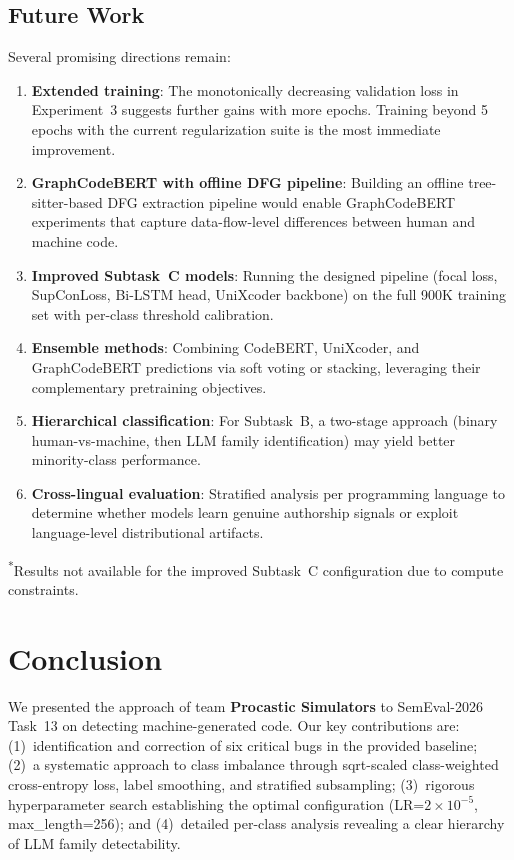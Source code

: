 \documentclass[11pt]{article}
\begin{document}
\subsection{Future Work}

Several promising directions remain:
\begin{enumerate}
    \item \textbf{Extended training}: The monotonically decreasing validation loss in Experiment~3 suggests further gains with more epochs. Training beyond 5 epochs with the current regularization suite is the most immediate improvement.
    \item \textbf{GraphCodeBERT with offline DFG pipeline}: Building an offline tree-sitter-based DFG extraction pipeline would enable GraphCodeBERT experiments that capture data-flow-level differences between human and machine code.
    \item \textbf{Improved Subtask~C models}: Running the designed pipeline (focal loss, SupConLoss, Bi-LSTM head, UniXcoder backbone) on the full 900K training set with per-class threshold calibration.
    \item \textbf{Ensemble methods}: Combining CodeBERT, UniXcoder, and GraphCodeBERT predictions via soft voting or stacking, leveraging their complementary pretraining objectives.
    \item \textbf{Hierarchical classification}: For Subtask~B, a two-stage approach (binary human-vs-machine, then LLM family identification) may yield better minority-class performance.
    \item \textbf{Cross-lingual evaluation}: Stratified analysis per programming language to determine whether models learn genuine authorship signals or exploit language-level distributional artifacts.
\end{enumerate}

\textsuperscript{*}Results not available for the improved Subtask~C configuration due to compute constraints.

\section{Conclusion}
\label{sec:conclusion}

We presented the approach of team \textbf{Procastic Simulators} to SemEval-2026 Task~13 on detecting machine-generated code. Our key contributions are: (1)~identification and correction of six critical bugs in the provided baseline; (2)~a systematic approach to class imbalance through sqrt-scaled class-weighted cross-entropy loss, label smoothing, and stratified subsampling; (3)~rigorous hyperparameter search establishing the optimal configuration (LR=$2{\times}10^{-5}$, max\_length=256); and (4)~detailed per-class analysis revealing a clear hierarchy of LLM family detectability.
\end{document}

